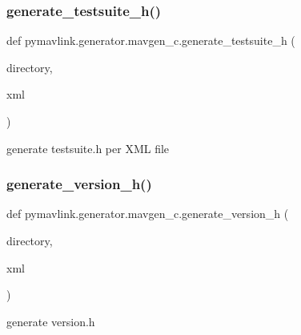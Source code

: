 \subsubsection{\texorpdfstring{generate\+\_\+testsuite\+\_\+h()}{generate\_testsuite\_h()}}
{\footnotesize\ttfamily def pymavlink.\+generator.\+mavgen\+\_\+c.\+generate\+\_\+testsuite\+\_\+h (\begin{DoxyParamCaption}\item[{}]{directory,  }\item[{}]{xml }\end{DoxyParamCaption})}

\begin{DoxyVerb}generate testsuite.h per XML file\end{DoxyVerb}
 \mbox{\label{namespacepymavlink_1_1generator_1_1mavgen__c_a205f217ad0dbb66616d4b22cd91e6d5e}} 
\subsubsection{\texorpdfstring{generate\+\_\+version\+\_\+h()}{generate\_version\_h()}}
{\footnotesize\ttfamily def pymavlink.\+generator.\+mavgen\+\_\+c.\+generate\+\_\+version\+\_\+h (\begin{DoxyParamCaption}\item[{}]{directory,  }\item[{}]{xml }\end{DoxyParamCaption})}

\begin{DoxyVerb}generate version.h\end{DoxyVerb}
 